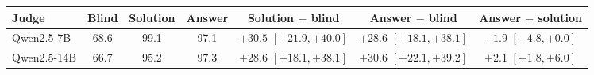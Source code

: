 \begin{tabular}{lcccccc}
\toprule
Judge & Blind & Solution & Answer & Solution $-$ blind & Answer $-$ blind & Answer $-$ solution \\
\midrule
Qwen2.5-7B & 68.6 & 99.1 & 97.1 & $+30.5$ {\scriptsize$[+21.9,+40.0]$} & $+28.6$ {\scriptsize$[+18.1,+38.1]$} & $-1.9$ {\scriptsize$[-4.8,+0.0]$} \\
Qwen2.5-14B & 66.7 & 95.2 & 97.3 & $+28.6$ {\scriptsize$[+18.1,+38.1]$} & $+30.6$ {\scriptsize$[+22.1,+39.2]$} & $+2.1$ {\scriptsize$[-1.8,+6.0]$} \\
\bottomrule
\end{tabular}
